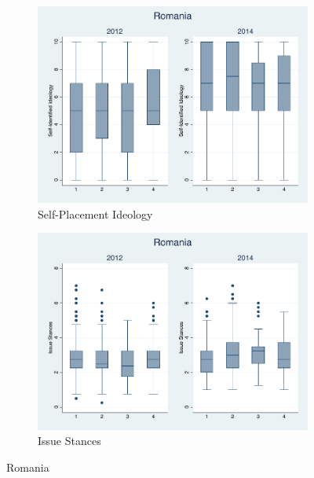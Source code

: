 \documentclass[12pt, titlepage]{article}
\begin{document}
\begin{figure}[H]
	\centering
	\begin{subfigure}[b]{0.475\textwidth}   
		\centering 
		\includegraphics[width=\textwidth]{IdeoBP/Romania}
		\caption{Self-Placement Ideology}
	\end{subfigure}
	\hfill
	\begin{subfigure}[b]{0.475\textwidth}
		\centering 
		\includegraphics[width=\textwidth]{BoxLib/Romania}
		\caption{Issue Stances}
	\end{subfigure}
	\caption{Romania}
	\label{Romania}
\end{figure}
\end{document}
